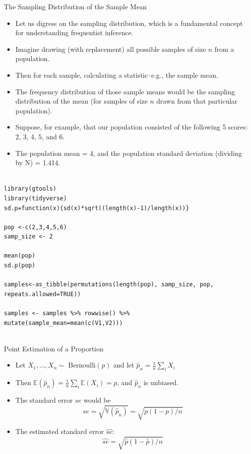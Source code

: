 \documentclass[handout]{beamer}
\begin{document}
\begin{frame}[fragile]{The Sampling Distribution of the Sample Mean}
\scriptsize{

\begin{itemize}
\item Let us digress on the sampling distribution, which is a fundamental concept for understanding frequentist inference.
\item Imagine drawing (with replacement) all possible samples of size $n$ from a population.
\item Then for each sample, calculating a statistic--e.g., the sample mean. 
\item The frequency distribution of those sample means would be the sampling distribution of the mean (for samples of size $n$ drawn from that particular population).
\item Suppose, for example, that our population consisted of the following 5 scores: 2, 3, 4, 5, and 6. 
\item The population mean = 4, and the population standard deviation (dividing by N) = 1.414.

\end{itemize}

\begin{verbatim}

library(gtools)
library(tidyverse)
sd.p=function(x){sd(x)*sqrt((length(x)-1)/length(x))}

pop <-c(2,3,4,5,6)
samp_size <- 2

mean(pop)
sd.p(pop)

samples<-as_tibble(permutations(length(pop), samp_size, pop, repeats.allowed=TRUE))

samples <- samples %>% rowwise() %>% mutate(sample_mean=mean(c(V1,V2)))
 
\end{verbatim}


} 
\end{frame}


\begin{frame}{Point Estimation of a Proportion}
\scriptsize{
\begin{itemize}
 \item Let $X_1, \dots, X_n \sim$ Bernoulli$(p)$ and let $\hat{p}_{n}=\frac 1n \sum_{i}X_{i}$
 \item Then $\mathbb{E}(\hat{p}_{n})= \frac 1n \sum_i \mathbb{E}(X_i)=p$, and $\hat{p}_n$ is unbiased.
 \item The standard error $se$ would be
\begin{displaymath}
se = \sqrt{\mathbb{V}(\hat{p}_n)}= \sqrt{p(1-p)/n} 
\end{displaymath}
\item The estimated standard error $\hat{se}$:
\begin{displaymath}
\hat{se} =\sqrt{\hat{p}(1-\hat p)/n} 
\end{displaymath}

\end{itemize}


} 
\end{frame}
\end{document}
